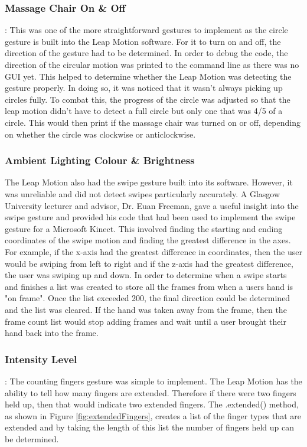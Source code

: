 \documentclass{l4proj}
\begin{document}
\subsubsection{Massage Chair On \& Off}: This was one of the more straightforward gestures to implement as the circle gesture is built into the Leap Motion software. For it to turn on and off, the direction of the gesture had to be determined. In order to debug the code, the direction of the circular motion was printed to the command line as there was no GUI yet. This helped to determine whether the Leap Motion was detecting the gesture properly. In doing so, it was noticed that it wasn't always picking up circles fully. To combat this, the progress of the circle was adjusted so that the leap motion didn't have to detect a full circle but only one that was 4/5 of a circle. This would then print if the massage chair was turned on or off, depending on whether the circle was clockwise or anticlockwise. 

\subsubsection{Ambient Lighting Colour \& Brightness} The Leap Motion also had the swipe gesture built into its software. However, it was unreliable and did not detect swipes particularly accurately. A Glasgow University lecturer and advisor, Dr. Euan Freeman, gave a useful insight into the swipe gesture and provided his code that had been used to implement the swipe gesture for a Microsoft Kinect. This involved finding the starting and ending coordinates of the swipe motion and finding the greatest difference in the axes. For example, if the x-axis had the greatest difference in coordinates, then the user would be swiping from left to right and if the z-axis had the greatest difference, the user was swiping up and down. In order to determine when a swipe starts and finishes a list was created to store all the frames from when a users hand is "on frame". Once the list exceeded 200, the final direction could be determined and the list was cleared. If the hand was taken away from the frame, then the frame count list would stop adding frames and wait until a user brought their hand back into the frame.

\subsubsection{Intensity Level}: The counting fingers gesture was simple to implement. The Leap Motion has the ability to tell how many fingers are extended. Therefore if there were two fingers held up, then that would indicate two extended fingers. The .extended() method, as shown in Figure \ref{fig:extendedFingers}, creates a list of the finger types that are extended and by taking the length of this list the number of fingers held up can be determined.
\end{document}
